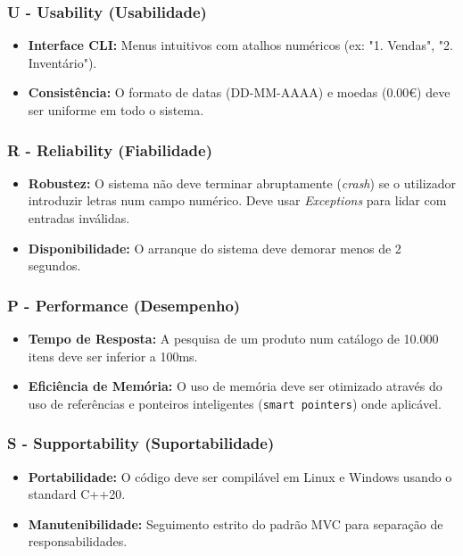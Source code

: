 \documentclass[runningheads,a4paper]{llncs}
\begin{document}
\subsubsection{U - Usability (Usabilidade)}
\begin{itemize}
    \item \textbf{Interface CLI:} Menus intuitivos com atalhos numéricos (ex: "1. Vendas", "2. Inventário").
    \item \textbf{Consistência:} O formato de datas (DD-MM-AAAA) e moedas (0.00€) deve ser uniforme em todo o sistema.
\end{itemize}

\subsubsection{R - Reliability (Fiabilidade)}
\begin{itemize}
    \item \textbf{Robustez:} O sistema não deve terminar abruptamente (\textit{crash}) se o utilizador introduzir letras num campo numérico. Deve usar \textit{Exceptions} para lidar com entradas inválidas.
    \item \textbf{Disponibilidade:} O arranque do sistema deve demorar menos de 2 segundos.
\end{itemize}

\subsubsection{P - Performance (Desempenho)}
\begin{itemize}
    \item \textbf{Tempo de Resposta:} A pesquisa de um produto num catálogo de 10.000 itens deve ser inferior a 100ms.
    \item \textbf{Eficiência de Memória:} O uso de memória deve ser otimizado através do uso de referências e ponteiros inteligentes (\texttt{smart pointers}) onde aplicável.
\end{itemize}

\subsubsection{S - Supportability (Suportabilidade)}
\begin{itemize}
    \item \textbf{Portabilidade:} O código deve ser compilável em Linux e Windows usando o standard C++20.
    \item \textbf{Manutenibilidade:} Seguimento estrito do padrão MVC para separação de responsabilidades.
\end{itemize}
\end{document}
